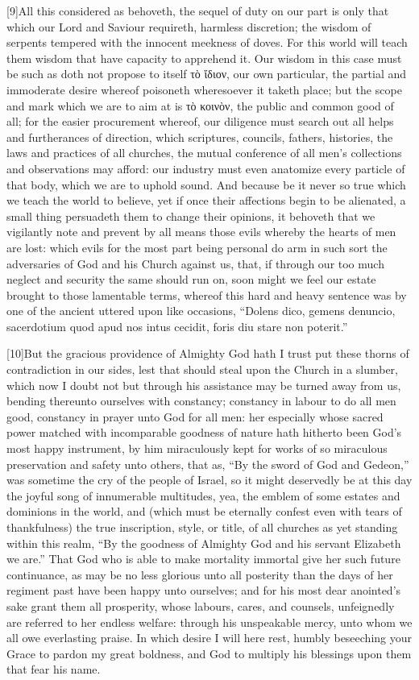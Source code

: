 [9]All this considered as behoveth, the sequel of duty on our part is only that which our Lord and Saviour requireth, harmless discretion; the wisdom of serpents tempered with the innocent meekness of doves. For this world will teach them wisdom that have capacity to apprehend it. Our wisdom in this case must be such as doth not propose to itself τὸ ἴδιον, our own particular, the partial and immoderate desire whereof poisoneth wheresoever it taketh place; but the scope and mark which we are to aim at is τὸ κοινὸν, the public and common good of all; for the easier procurement whereof, our diligence must search out all helps and furtherances of direction, which scriptures, councils, fathers, histories, the laws and practices of all churches, the mutual conference of all men’s collections and observations may afford: our industry must even anatomize every particle of that body, which we are to uphold sound. And because be it never so true which we teach the world to believe, yet if once their affections begin to be alienated, a small thing persuadeth them to change their opinions, it behoveth that we vigilantly note and prevent by all means those evils whereby the hearts of men are lost: which evils for the most part being personal do arm in such sort the adversaries of God and his Church against us, that, if through our too much neglect and security the same should run on, soon might we feel our estate brought to those lamentable terms, whereof this hard and heavy sentence was by one of the ancient uttered upon like occasions, “Dolens dico, gemens denuncio, sacerdotium quod apud nos intus cecidit, foris diu stare non poterit.”

[10]But the gracious providence of Almighty God hath I trust put these thorns of contradiction in our sides, lest that should steal upon the Church in a slumber, which now I doubt not but through his assistance may be turned away from us, bending thereunto ourselves with constancy; constancy in labour to do all men good, constancy in prayer unto God for all men: her especially whose sacred power matched with incomparable goodness of nature hath hitherto been God’s most happy instrument, by him miraculously kept for works of so miraculous preservation and safety unto others, that as, “By the sword of God and Gedeon,” was sometime the cry of the people of Israel, so it might deservedly be at this day the joyful song of innumerable multitudes, yea, the emblem of some estates and dominions in the world, and (which must be eternally confest even with tears of thankfulness) the true inscription, style, or title, of all churches as yet standing within this realm, “By the goodness of Almighty God and his servant Elizabeth we are.” That God who is able to make mortality immortal give her such future continuance, as may be no less glorious unto all posterity than the days of her regiment past have been happy unto ourselves; and for his most dear anointed’s sake grant them all prosperity, whose labours, cares, and counsels, unfeignedly are referred to her endless welfare: through his unspeakable mercy, unto whom we all owe everlasting praise. In which desire I will here rest, humbly beseeching your Grace to pardon my great boldness, and God to multiply his blessings upon them that fear his name.

